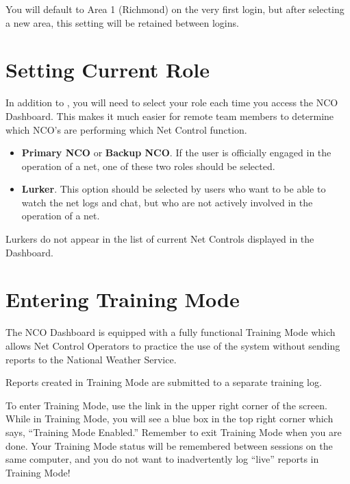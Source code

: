 \documentclass[pdflatex,letterpaper,twoside,12pt]{book}
\begin{document}
You will default to Area 1 (Richmond) on the very first login, but after selecting a new area, this setting will be retained between logins.


\section{Setting Current Role}\label{dash-set-role}

In addition to , you will need to select your role each time you access the NCO Dashboard.  This makes it much easier for remote team members to determine which NCO's are performing which Net Control function.

\begin{itemize}
\item {\bf Primary NCO} or {\bf Backup NCO}.  If the user is officially engaged in the operation of a net, one of these two roles should be selected.
\item {\bf Lurker}.  This option should be selected by users who want to be able to watch the net logs and chat, but who are not actively involved in the operation of a net.
\end{itemize}

Lurkers do not appear in the list of current Net Controls displayed in the Dashboard.


\section{Entering Training Mode}\label{enter-training-mode}

The NCO Dashboard is equipped with a fully functional Training Mode which allows Net Control Operators to practice the use of the system without sending reports to the National Weather Service.

Reports created in Training Mode are submitted to a separate training log.

To enter Training Mode, use the link in the upper right corner of the screen.  While in Training Mode, you will see a blue box in the top right corner which says, ``Training Mode Enabled.''  Remember to exit Training Mode when you are done.  Your Training Mode status will be remembered between sessions on the same computer, and you do not want to inadvertently log ``live'' reports in Training Mode!
\end{document}
